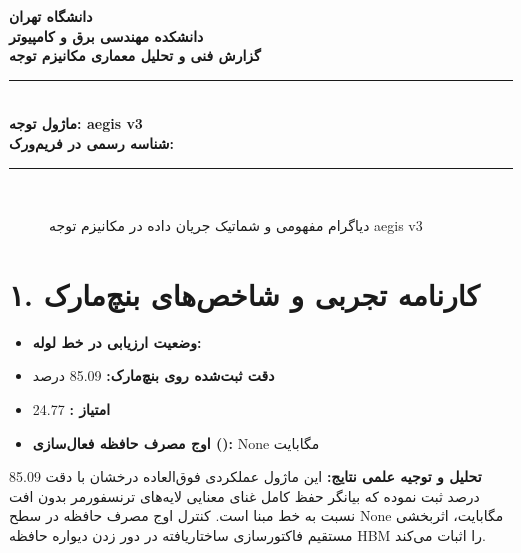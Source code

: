 \documentclass[12pt,a4paper]{article}
\begin{document}
\begin{center}
{\Large\bfseries دانشگاه تهران}\\[0.2cm]
{\large\bfseries دانشکده مهندسی برق و کامپیوتر}\\[0.2cm]
{\large\bfseries گزارش فنی و تحلیل معماری مکانیزم توجه}\\[0.5cm]
\rule{\linewidth}{1pt}\\[0.3cm]
{\LARGE\bfseries ماژول توجه: aegis v3}\\[0.2cm]
{\large \textbf{شناسه رسمی در فریم‌ورک:} }\\[0.2cm]
\rule{\linewidth}{1pt}\\[0.5cm]
\end{center}

\begin{figure}[H]
\centering
{}
\caption{دیاگرام مفهومی و شماتیک جریان داده در مکانیزم توجه aegis v3}
\end{figure}

\section*{۱. کارنامه تجربی و شاخص‌های بنچ‌مارک}
\begin{itemize}
\item \textbf{وضعیت ارزیابی در خط لوله:} 
\item \textbf{دقت ثبت‌شده روی بنچ‌مارک:} 85.09 درصد
\item \textbf{امتیاز :} 24.77
\item \textbf{اوج مصرف حافظه فعال‌سازی ():} None مگابایت
\end{itemize}
\textbf{تحلیل و توجیه علمی نتایج:} این ماژول عملکردی فوق‌العاده درخشان با دقت 85.09 درصد ثبت نموده که بیانگر حفظ کامل غنای معنایی لایه‌های ترنسفورمر بدون افت نسبت به خط مبنا است. کنترل اوج مصرف حافظه در سطح None مگابایت، اثربخشی مستقیم فاکتورسازی ساختاریافته در دور زدن دیواره حافظه HBM را اثبات می‌کند.
\end{document}
